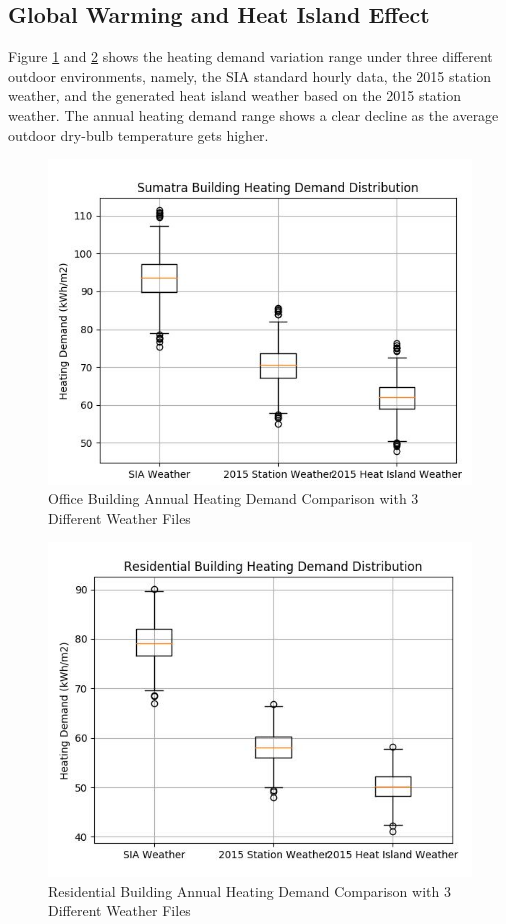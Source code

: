 \documentclass[a4paper, oneside]{discothesis}
\begin{document}
        \subsection{Global Warming and Heat Island Effect}
		Figure \ref{fig:Sumatra_Comp} and \ref{fig:Hongg_Comp} shows the heating demand variation range under three different outdoor environments, namely, the SIA standard hourly data, the 2015 station weather, and the generated heat island weather based on the 2015 station weather. The annual heating demand range shows a clear decline as the average outdoor dry-bulb temperature gets higher.

	    \begin{figure}[H]
		\centering
		\includegraphics[scale=0.7]{Sumatra_Comparison.jpg}
		\caption{Office Building Annual Heating Demand Comparison with 3 Different Weather Files}
		\label{fig:Sumatra_Comp}
		\end{figure}

	    \begin{figure}[H]
		\centering
		\includegraphics[scale=0.7]{Hongg_Comparison.jpg}
		\caption{Residential Building Annual Heating Demand Comparison with 3 Different Weather Files}
		\label{fig:Hongg_Comp}
		\end{figure}
		
\end{document}
